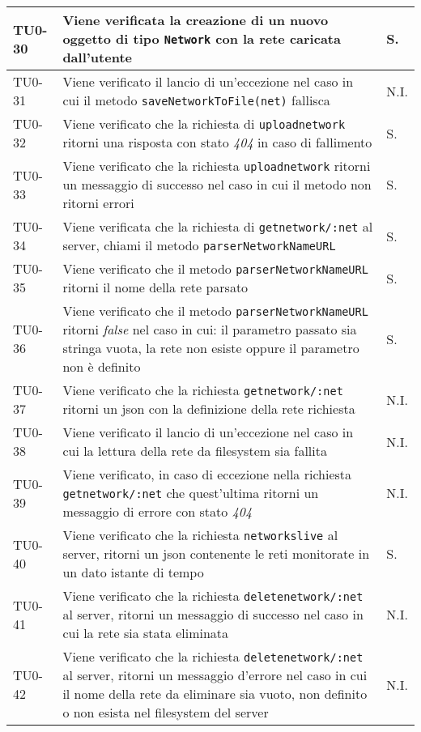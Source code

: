 \begin{longtable}{|C{.15\textwidth}|m{.66\textwidth}|C{.10\textwidth}|}
\hline 
TU0-30 & Viene verificata la creazione di un nuovo oggetto di tipo \texttt{Network} con la rete caricata dall'utente & S. \\ 
\hline
{} TU0-31 & Viene verificato il lancio di un'eccezione nel caso in cui il metodo \texttt{saveNetworkToFile(net)} fallisca & N.I. \\
\hline
TU0-32 & Viene verificato che la richiesta di \texttt{uploadnetwork} ritorni una risposta con stato \textit{404} in caso di fallimento & S. \\ 
\hline
{} TU0-33 & Viene verificato che la richiesta \texttt{uploadnetwork} ritorni un messaggio di successo nel caso in cui il metodo non ritorni errori & S. \\
\hline
TU0-34 & Viene verificata che la richiesta di \texttt{getnetwork/:net} al server, chiami il metodo \texttt{parserNetworkNameURL} & S. \\ 
\hline
{} TU0-35 & Viene verificato che il metodo \texttt{parserNetworkNameURL} ritorni il nome della rete parsato & S. \\ 
\hline 
TU0-36 & Viene verificato che il metodo \texttt{parserNetworkNameURL} ritorni \textit{false} nel caso in cui: il parametro passato sia stringa vuota, la rete non esiste oppure il parametro non è definito & S. \\ 
\hline 
{}TU0-37 & Viene verificato che la richiesta \texttt{getnetwork/:net} ritorni un json con la definizione della rete richiesta & N.I. \\ 
\hline 
TU0-38 & Viene verificato il lancio di un'eccezione nel caso in cui la lettura della rete da filesystem sia fallita & N.I. \\
\hline
  TU0-39 & Viene verificato, in caso di eccezione nella richiesta \texttt{getnetwork/:net} che quest'ultima ritorni un messaggio di errore con stato \textit{404} & N.I. \\ 
 \hline
TU0-40 & Viene verificato che la richiesta \texttt{networkslive} al server, ritorni un json contenente le reti monitorate in un dato istante di tempo & S. \\ 
 \hline 
 TU0-41 & Viene verificato che la richiesta \texttt{deletenetwork/:net} al server, ritorni un messaggio di successo nel caso in cui la rete sia stata eliminata & N.I. \\
 \hline
 TU0-42 & Viene verificato che la richiesta \texttt{deletenetwork/:net} al server, ritorni un messaggio d'errore nel caso in cui il nome della rete da eliminare sia vuoto,  non definito o non esista nel filesystem del server & N.I. \\ 

\end{longtable}
